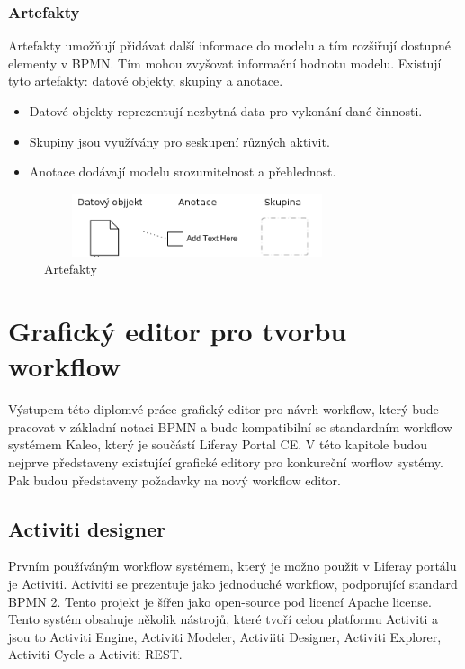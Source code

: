 \documentclass{fithesis}
\begin{document}
\subsection{Artefakty}
Artefakty umožňují přidávat další informace do modelu a tím rozšiřují dostupné elementy v BPMN. Tím mohou zvyšovat informační hodnotu modelu. Existují tyto artefakty: datové objekty, skupiny a anotace.

\begin{itemize}
\item Datové objekty reprezentují nezbytná data pro vykonání dané činnosti.
\item Skupiny jsou využívány pro seskupení různých aktivit.
\item Anotace dodávají modelu srozumitelnost a přehlednost.
\end{itemize}

\begin{figure}[htp]
\centering
\includegraphics[width=340px,height=70px]{images/artefakty.png}
\caption{Artefakty}
\end{figure}



\chapter{Grafický editor pro tvorbu workflow}
Výstupem této diplomvé práce grafický editor pro návrh workflow, který bude pracovat v základní notaci BPMN a bude kompatibilní se standardním workflow systémem Kaleo, který je součástí Liferay Portal CE. V této kapitole budou nejprve představeny existující grafické editory pro konkureční worflow systémy. Pak budou představeny požadavky na nový workflow editor.

\section{Activiti designer}
Prvním používáným workflow systémem, který je možno použít v Liferay portálu je Activiti. Activiti se prezentuje jako jednoduché workflow, podporující standard BPMN 2. Tento projekt je šířen jako open-source pod licencí Apache license. Tento systém obsahuje několik nástrojů, které tvoří celou platformu Activiti a jsou to Activiti Engine, Activiti Modeler, Activiiti Designer, Activiti Explorer, Activiti Cycle a Activiti REST.
\end{document}

